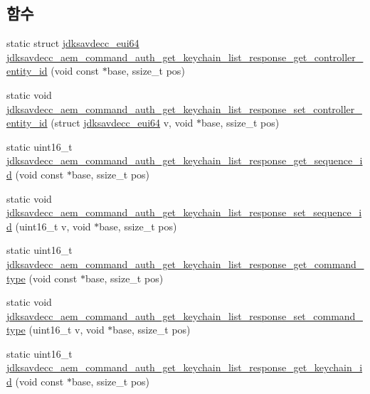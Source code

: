 \subsection*{함수}
\begin{DoxyCompactItemize}
\item 
static struct \hyperlink{structjdksavdecc__eui64}{jdksavdecc\+\_\+eui64} \hyperlink{group__command__auth__get__keychain__list__response_gab9e87e9602be62ded2f213e9cc020c6f}{jdksavdecc\+\_\+aem\+\_\+command\+\_\+auth\+\_\+get\+\_\+keychain\+\_\+list\+\_\+response\+\_\+get\+\_\+controller\+\_\+entity\+\_\+id} (void const $\ast$base, ssize\+\_\+t pos)
\item 
static void \hyperlink{group__command__auth__get__keychain__list__response_ga85953a2bab00449d6767c12124e0db4a}{jdksavdecc\+\_\+aem\+\_\+command\+\_\+auth\+\_\+get\+\_\+keychain\+\_\+list\+\_\+response\+\_\+set\+\_\+controller\+\_\+entity\+\_\+id} (struct \hyperlink{structjdksavdecc__eui64}{jdksavdecc\+\_\+eui64} v, void $\ast$base, ssize\+\_\+t pos)
\item 
static uint16\+\_\+t \hyperlink{group__command__auth__get__keychain__list__response_gafc09d79a0c1aad5ac7851e137d0e0e96}{jdksavdecc\+\_\+aem\+\_\+command\+\_\+auth\+\_\+get\+\_\+keychain\+\_\+list\+\_\+response\+\_\+get\+\_\+sequence\+\_\+id} (void const $\ast$base, ssize\+\_\+t pos)
\item 
static void \hyperlink{group__command__auth__get__keychain__list__response_ga2e5575d8b78eae7d13d4390b30452556}{jdksavdecc\+\_\+aem\+\_\+command\+\_\+auth\+\_\+get\+\_\+keychain\+\_\+list\+\_\+response\+\_\+set\+\_\+sequence\+\_\+id} (uint16\+\_\+t v, void $\ast$base, ssize\+\_\+t pos)
\item 
static uint16\+\_\+t \hyperlink{group__command__auth__get__keychain__list__response_gad9d9db5c44de440e9a718bff4ee9f310}{jdksavdecc\+\_\+aem\+\_\+command\+\_\+auth\+\_\+get\+\_\+keychain\+\_\+list\+\_\+response\+\_\+get\+\_\+command\+\_\+type} (void const $\ast$base, ssize\+\_\+t pos)
\item 
static void \hyperlink{group__command__auth__get__keychain__list__response_gad74bdb8ae53011a0f2d5a2d62434291a}{jdksavdecc\+\_\+aem\+\_\+command\+\_\+auth\+\_\+get\+\_\+keychain\+\_\+list\+\_\+response\+\_\+set\+\_\+command\+\_\+type} (uint16\+\_\+t v, void $\ast$base, ssize\+\_\+t pos)
\item 
static uint16\+\_\+t \hyperlink{group__command__auth__get__keychain__list__response_gae1500e4f77cb98f34426d4d84130412d}{jdksavdecc\+\_\+aem\+\_\+command\+\_\+auth\+\_\+get\+\_\+keychain\+\_\+list\+\_\+response\+\_\+get\+\_\+keychain\+\_\+id} (void const $\ast$base, ssize\+\_\+t pos)

\end{DoxyCompactItemize}
